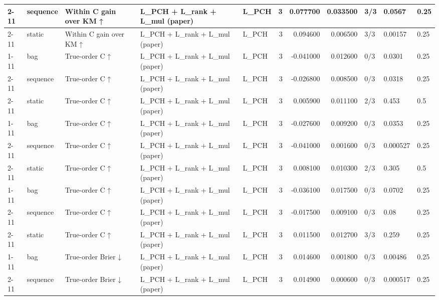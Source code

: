 \begin{tabular}{lllllrrrlll}
\cline{2-11} \cline{3-11}
 & sequence & Within C gain over KM ↑ & L\_PCH + L\_rank + L\_mul (paper) & L\_PCH & 3 & 0.077700 & 0.033500 & 3/3 & 0.0567 & 0.25 \\
\cline{2-11} \cline{3-11}
 & static & Within C gain over KM ↑ & L\_PCH + L\_rank + L\_mul (paper) & L\_PCH & 3 & 0.094600 & 0.006500 & 3/3 & 0.00157 & 0.25 \\
\cline{1-11} \cline{2-11} \cline{3-11}
\multirow[t]{3}{*}{ehrsim2\_level} & bag & True-order C ↑ & L\_PCH + L\_rank + L\_mul (paper) & L\_PCH & 3 & -0.041000 & 0.012600 & 0/3 & 0.0301 & 0.25 \\
\cline{2-11} \cline{3-11}
 & sequence & True-order C ↑ & L\_PCH + L\_rank + L\_mul (paper) & L\_PCH & 3 & -0.026800 & 0.008500 & 0/3 & 0.0318 & 0.25 \\
\cline{2-11} \cline{3-11}
 & static & True-order C ↑ & L\_PCH + L\_rank + L\_mul (paper) & L\_PCH & 3 & 0.005900 & 0.011100 & 2/3 & 0.453 & 0.5 \\
\cline{1-11} \cline{2-11} \cline{3-11}
\multirow[t]{3}{*}{ehrsim2\_mixed} & bag & True-order C ↑ & L\_PCH + L\_rank + L\_mul (paper) & L\_PCH & 3 & -0.027600 & 0.009200 & 0/3 & 0.0353 & 0.25 \\
\cline{2-11} \cline{3-11}
 & sequence & True-order C ↑ & L\_PCH + L\_rank + L\_mul (paper) & L\_PCH & 3 & -0.041000 & 0.001600 & 0/3 & 0.000527 & 0.25 \\
\cline{2-11} \cline{3-11}
 & static & True-order C ↑ & L\_PCH + L\_rank + L\_mul (paper) & L\_PCH & 3 & 0.008100 & 0.010300 & 2/3 & 0.305 & 0.5 \\
\cline{1-11} \cline{2-11} \cline{3-11}
\multirow[t]{3}{*}{ehrsim2\_order} & bag & True-order C ↑ & L\_PCH + L\_rank + L\_mul (paper) & L\_PCH & 3 & -0.036100 & 0.017500 & 0/3 & 0.0702 & 0.25 \\
\cline{2-11} \cline{3-11}
 & sequence & True-order C ↑ & L\_PCH + L\_rank + L\_mul (paper) & L\_PCH & 3 & -0.017500 & 0.009100 & 0/3 & 0.08 & 0.25 \\
\cline{2-11} \cline{3-11}
 & static & True-order C ↑ & L\_PCH + L\_rank + L\_mul (paper) & L\_PCH & 3 & 0.011500 & 0.012700 & 3/3 & 0.259 & 0.25 \\
\cline{1-11} \cline{2-11} \cline{3-11}
\multirow[t]{3}{*}{ehrsim2\_level} & bag & True-order Brier ↓ & L\_PCH + L\_rank + L\_mul (paper) & L\_PCH & 3 & 0.014600 & 0.001800 & 0/3 & 0.00486 & 0.25 \\
\cline{2-11} \cline{3-11}
 & sequence & True-order Brier ↓ & L\_PCH + L\_rank + L\_mul (paper) & L\_PCH & 3 & 0.014900 & 0.000600 & 0/3 & 0.000517 & 0.25 \\

\end{tabular}
